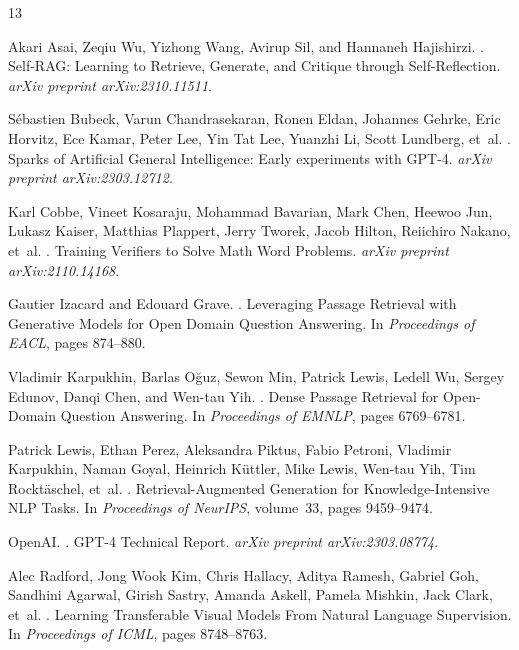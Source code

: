 \documentclass[11pt]{article}
\begin{document}

\begin{thebibliography}{13}

Akari Asai, Zeqiu Wu, Yizhong Wang, Avirup Sil, and Hannaneh Hajishirzi.
.
\newblock Self-RAG: Learning to Retrieve, Generate, and Critique through Self-Reflection.
\newblock \textit{arXiv preprint arXiv:2310.11511}.

Sébastien Bubeck, Varun Chandrasekaran, Ronen Eldan, Johannes Gehrke, Eric Horvitz, Ece Kamar, Peter Lee, Yin Tat Lee, Yuanzhi Li, Scott Lundberg, et~al.
.
\newblock Sparks of Artificial General Intelligence: Early experiments with GPT-4.
\newblock \textit{arXiv preprint arXiv:2303.12712}.

Karl Cobbe, Vineet Kosaraju, Mohammad Bavarian, Mark Chen, Heewoo Jun, Lukasz Kaiser, Matthias Plappert, Jerry Tworek, Jacob Hilton, Reiichiro Nakano, et~al.
.
\newblock Training Verifiers to Solve Math Word Problems.
\newblock \textit{arXiv preprint arXiv:2110.14168}.

Gautier Izacard and Edouard Grave.
.
\newblock Leveraging Passage Retrieval with Generative Models for Open Domain Question Answering.
\newblock In \textit{Proceedings of EACL}, pages 874--880.

Vladimir Karpukhin, Barlas Oğuz, Sewon Min, Patrick Lewis, Ledell Wu, Sergey Edunov, Danqi Chen, and Wen-tau Yih.
.
\newblock Dense Passage Retrieval for Open-Domain Question Answering.
\newblock In \textit{Proceedings of EMNLP}, pages 6769--6781.

Patrick Lewis, Ethan Perez, Aleksandra Piktus, Fabio Petroni, Vladimir Karpukhin, Naman Goyal, Heinrich Küttler, Mike Lewis, Wen-tau Yih, Tim Rocktäschel, et~al.
.
\newblock Retrieval-Augmented Generation for Knowledge-Intensive NLP Tasks.
\newblock In \textit{Proceedings of NeurIPS}, volume~33, pages 9459--9474.

OpenAI.
.
\newblock GPT-4 Technical Report.
\newblock \textit{arXiv preprint arXiv:2303.08774}.

Alec Radford, Jong Wook Kim, Chris Hallacy, Aditya Ramesh, Gabriel Goh, Sandhini Agarwal, Girish Sastry, Amanda Askell, Pamela Mishkin, Jack Clark, et~al.
.
\newblock Learning Transferable Visual Models From Natural Language Supervision.
\newblock In \textit{Proceedings of ICML}, pages 8748--8763.


\end{thebibliography}
\end{document}
